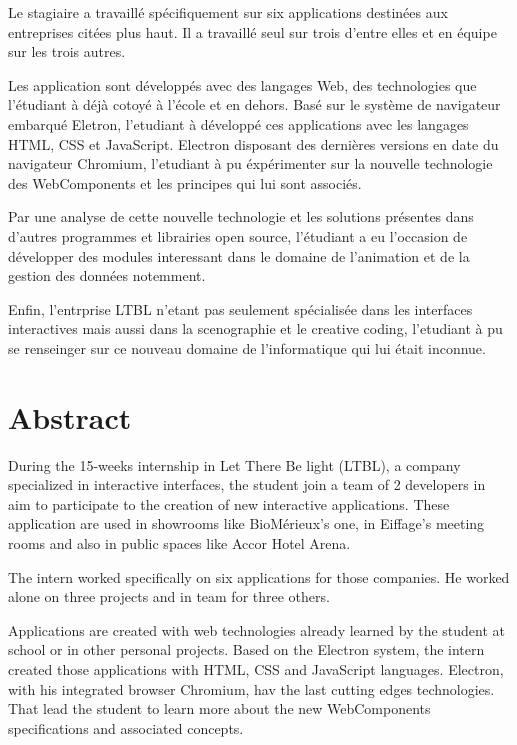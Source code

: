 \documentclass{article}
\begin{document}
    Le stagiaire a travaillé spécifiquement sur six applications destinées aux entreprises citées plus haut.
    Il a travaillé seul sur trois d'entre elles et en équipe sur les trois autres.

    Les application sont développés avec des langages Web, des technologies que l'étudiant à déjà cotoyé à l'école et en dehors.
    Basé sur le système de navigateur embarqué Eletron, l'etudiant à développé ces applications avec les langages HTML, CSS et JavaScript.
    Electron disposant des dernières versions en date du navigateur Chromium, l'etudiant à pu éxpérimenter sur la nouvelle technologie des WebComponents et les principes qui lui sont associés.

    Par une analyse de cette nouvelle technologie et les solutions présentes dans d'autres programmes et librairies open source, l'étudiant a eu l'occasion de développer des modules interessant dans le domaine de l'animation et de la gestion des données notemment.

    Enfin, l'entrprise LTBL n'etant pas seulement spécialisée dans les interfaces interactives mais aussi dans la scenographie et le creative coding,
    l'etudiant à pu se renseinger sur ce nouveau domaine de l'informatique qui lui était inconnue.

    \section{Abstract}

    During the 15-weeks internship in Let There Be light (LTBL), a company specialized in interactive interfaces, the student join a team of 2 developers in aim to participate to the creation of new interactive applications.
    These application are used in showrooms like BioMérieux's one, in Eiffage's meeting rooms and also in public spaces like Accor Hotel Arena.

    The intern worked specifically on six applications for those companies.
    He worked alone on three projects and in team for three others.

    Applications are created with web technologies already learned by the student at school or in other personal projects.
    Based on the Electron system, the intern created those applications with HTML, CSS and JavaScript languages.
    Electron, with his integrated browser Chromium, hav the last cutting edges technologies.
    That lead the student to learn more about the new WebComponents specifications and associated concepts.
\end{document}
